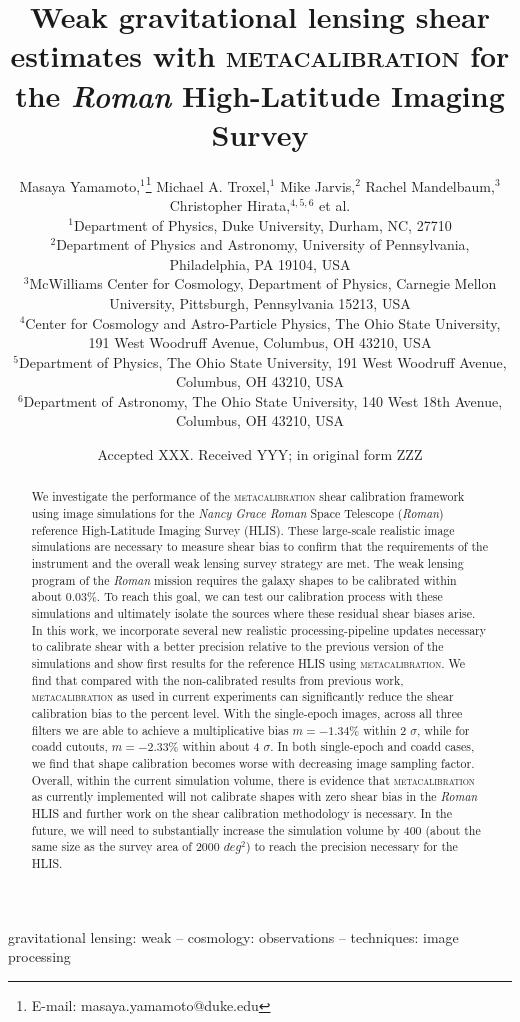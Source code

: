\documentclass[fleqn,usenatbib]{mnras}
\title[Metacalibration for the Roman High-Latitude Imaging Survey]{Weak gravitational lensing shear estimates with \textsc{metacalibration} for the \emph{Roman} High-Latitude Imaging Survey}
\author[M. Yamamoto et al.]{
Masaya Yamamoto,$^{1}$\thanks{E-mail: masaya.yamamoto@duke.edu}
Michael A. Troxel,$^{1}$
Mike Jarvis,$^{2}$
Rachel Mandelbaum,$^{3}$
Christopher Hirata,$^{4,5,6}$
 et al.\\
$^{1}$Department of Physics, Duke University, Durham, NC, 27710\\
$^{2}$Department of Physics and Astronomy, University of Pennsylvania, Philadelphia, PA 19104, USA\\
$^{3}$McWilliams Center for Cosmology, Department of Physics, Carnegie Mellon University, Pittsburgh, Pennsylvania 15213, USA\\
$^{4}$Center for Cosmology and Astro-Particle Physics, The Ohio State University, 191 West Woodruff Avenue, Columbus, OH 43210, USA\\
$^{5}$Department of Physics, The Ohio State University, 191 West Woodruff Avenue, Columbus, OH 43210, USA\\
$^{6}$Department of Astronomy, The Ohio State University, 140 West 18th Avenue, Columbus, OH 43210, USA\\
}
\date{Accepted XXX. Received YYY; in original form ZZZ}
\begin{document}
\label{firstpage}
\pagerange{\pageref{firstpage}--\pageref{lastpage}}
\maketitle

\begin{abstract}
We investigate the performance of the \textsc{metacalibration} shear calibration framework using image simulations for the \emph{Nancy Grace Roman} Space Telescope (\emph{Roman}) reference High-Latitude Imaging Survey (HLIS). These large-scale realistic image simulations are necessary to measure shear bias to confirm that the requirements of the instrument and the overall weak lensing survey strategy are met. The weak lensing program of the \emph{Roman} mission requires the galaxy shapes to be calibrated within about 0.03\%. To reach this goal, we can test our calibration process with these simulations and ultimately isolate the sources where these residual shear biases arise. In this work, we incorporate several new realistic processing-pipeline updates necessary to calibrate shear with a better precision relative to the previous version of the simulations and show first results for the reference HLIS using \textsc{metacalibration}. We find that compared with the non-calibrated results from previous work, \textsc{metacalibration} as used in current experiments can significantly reduce the shear calibration bias to the percent level. With the single-epoch images, across all three filters we are able to achieve a multiplicative bias $m=-1.34\%$ within 2 $\sigma$, while for coadd cutouts, $m=-2.33\%$ within about 4 $\sigma$. In both single-epoch and coadd cases, we find that shape calibration becomes worse with decreasing image sampling factor. Overall, within the current simulation volume, there is evidence that \textsc{metacalibration} as currently implemented will not calibrate shapes with zero shear bias in the \emph{Roman} HLIS and further work on the shear calibration methodology is necessary. In the future, we will need to substantially increase the simulation volume by 400 (about the same size as the survey area of 2000 $deg^{2}$) to reach the precision necessary for the HLIS.
\end{abstract}

\begin{keywords}
gravitational lensing: weak -- cosmology: observations -- techniques: image processing
\end{keywords}
\end{document}
